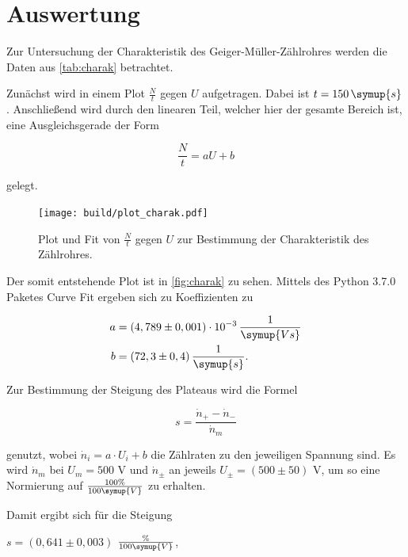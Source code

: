 \section{Auswertung}
\label{sec:Auswertung}

Zur Untersuchung der Charakteristik des Geiger-Müller-Zählrohres werden die Daten aus \autoref{tab:charak} betrachtet.



Zunächst wird in einem Plot $\frac{N}{t}$ gegen $U$ aufgetragen. Dabei ist $t = 150 \, \symup{s}$.
Anschließend wird durch den linearen Teil, welcher hier der gesamte Bereich ist, eine Ausgleichsgerade der Form

\begin{equation}
    \frac{N}{t} = a U + b
\end{equation}

gelegt.

\begin{figure}
  \centering
  \texttt{[image: build/plot\_charak.pdf]}
  \caption{Plot und Fit von $\frac{N}{t}$ gegen $U$ zur Bestimmung der Charakteristik des Zählrohres.}
  \label{fig:charak}
\end{figure}

Der somit entstehende Plot ist in \autoref{fig:charak} zu sehen.
Mittels des Python 3.7.0 Paketes Curve Fit ergeben sich zu Koeffizienten zu

\begin{align*}
    a &= (4,789 \pm 0,001) \cdot 10^{-3} \, \frac{1}{\symup{Vs}}\\
    b &= (72,3 \pm 0,4) \, \frac{1}{\symup{s}}.
\end{align*}

Zur Bestimmung der Steigung des Plateaus wird die Formel

\begin{equation}
    s = \frac{\dot{n}_+ - \dot{n}_-}{\dot{n}_m}
\end{equation}

genutzt, wobei $\dot{n}_i = a \cdot U_i + b$ die Zählraten zu den jeweiligen Spannung sind.
Es wird $\dot{n}_m$ bei $U_m = 500$ V und $\dot{n}_\pm$ an jeweils $U_\pm = (500 \pm 50)$ V, um so eine Normierung auf $\frac{100 \%}{100\symup{V}}$ zu erhalten.

Damit ergibt sich für die Steigung

\begin{center}
    $s = (0,641 \pm 0,003)$ $\frac{\%}{100\symup{V}}$,
\end{center}


